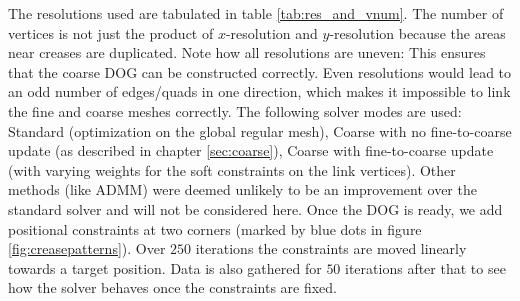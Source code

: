 \documentclass[a4paper,twoside,12pt,nochapterprefix]{scrbook}
\begin{document}
The resolutions used are tabulated in table \ref{tab:res_and_vnum}. The number of vertices is not just the product of $x$-resolution and $y$-resolution because the areas near creases are duplicated. Note how all resolutions are uneven: This ensures that the coarse DOG can be constructed correctly. Even resolutions would lead to an odd number of edges/quads in one direction, which makes it impossible to link the fine and coarse meshes correctly.\newline
The following solver modes are used: Standard (optimization on the global regular mesh), Coarse with no fine-to-coarse update (as described in chapter \ref{sec:coarse}), Coarse with fine-to-coarse update (with varying weights for the soft constraints on the link vertices). Other methods (like ADMM) were deemed unlikely to be an improvement over the standard solver and will not be considered here.\newline
Once the DOG is ready, we add positional constraints at two corners (marked by blue dots in figure \ref{fig:creasepatterns}). Over $250$ iterations the constraints are moved linearly towards a target position. Data is also gathered for $50$ iterations after that to see how the solver behaves once the constraints are fixed.\newline
\end{document}
